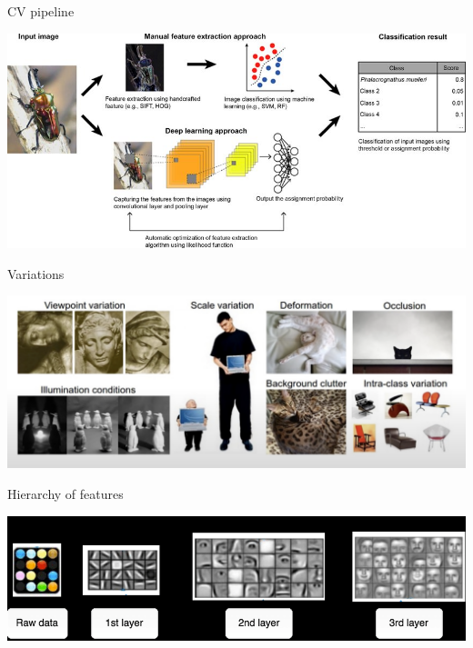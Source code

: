 \documentclass[aspectratio=169,xcolor=dvipsnames]{beamer}
\begin{document}
\begin{frame}{CV pipeline}
    \begin{center}
        \includegraphics[width=\textwidth]{../images/Schematic-diagram-of-computer-vision-machine-learning-pipeline-for-image-based-species.png}
    \end{center}
\end{frame}

\begin{frame}{Variations}
    \begin{center}
        \includegraphics[width=\textwidth]{../images/variations.png}
    \end{center}
\end{frame}

\begin{frame}{Hierarchy of features}
    \begin{center}
        \includegraphics[width=\textwidth]{../images/hierarchy.png}
    \end{center}
\end{frame}
\end{document}
